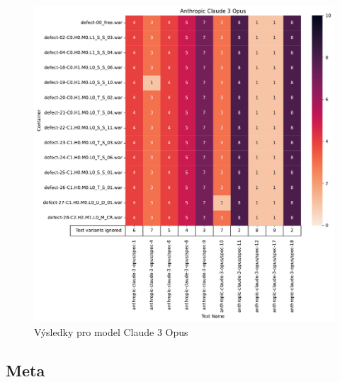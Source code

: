 \documentclass[czech, ma, kiv, he, iso690numb, pdf, viewonly]{fasthesis}
\begin{document}
            \begin{figure}[H]
                \includegraphics[width=\textwidth]{pic/claude-3-opus-results.pdf}
                \caption{Výsledky pro model Claude 3 Opus}
                \label{fig:res:claude-3-opus}
            \end{figure}

        \subsection{Meta} \label{sec:res:meta}
\end{document}
